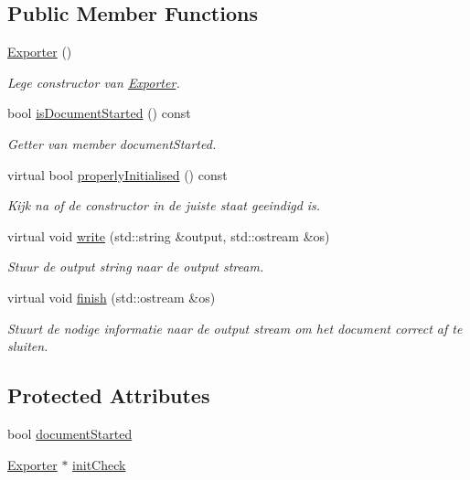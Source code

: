 \subsection*{Public Member Functions}
\begin{DoxyCompactItemize}
\item 
\hyperlink{class_exporter_a2a977cb5ac8f637fcb570e73f650eca0}{Exporter} ()
\begin{DoxyCompactList}\small\item\em Lege constructor van \hyperlink{class_exporter}{Exporter}. \end{DoxyCompactList}\item 
bool \hyperlink{class_exporter_afba4e69e23ad018c26b21c0f4b85ef12}{is\+Document\+Started} () const 
\begin{DoxyCompactList}\small\item\em Getter van member document\+Started. \end{DoxyCompactList}\item 
virtual bool \hyperlink{class_exporter_af01d2a6c2f54329b1867a19537e11a34}{properly\+Initialised} () const 
\begin{DoxyCompactList}\small\item\em Kijk na of de constructor in de juiste staat geeindigd is. \end{DoxyCompactList}\item 
virtual void \hyperlink{class_exporter_ab3736803133eb727cf87a7306f91eb11}{write} (std\+::string \&output, std\+::ostream \&os)
\begin{DoxyCompactList}\small\item\em Stuur de output string naar de output stream. \end{DoxyCompactList}\item 
virtual void \hyperlink{class_exporter_ae477714f462d70cfc5b3970f91fcc4ed}{finish} (std\+::ostream \&os)
\begin{DoxyCompactList}\small\item\em Stuurt de nodige informatie naar de output stream om het document correct af te sluiten. \end{DoxyCompactList}\end{DoxyCompactItemize}
\subsection*{Protected Attributes}
\begin{DoxyCompactItemize}
\item 
bool \hyperlink{class_exporter_a7d55f6023d5fe983512f6b02fb60733b}{document\+Started}
\item 
\hyperlink{class_exporter}{Exporter} $\ast$ \hyperlink{class_exporter_a74245e988d8e72a43704dda927acff05}{init\+Check}
\end{DoxyCompactItemize}


